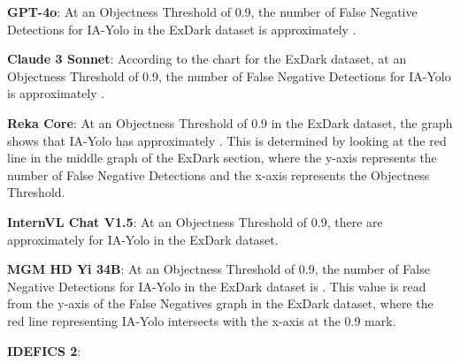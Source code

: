 \begin{wronganswer}
\textbf{GPT-4o}: \small{At an Objectness Threshold of 0.9, the number of False Negative Detections for IA-Yolo in the ExDark dataset is approximately .}
\end{wronganswer}

\begin{wronganswer}
\textbf{Claude 3 Sonnet}: \small{According to the chart for the ExDark dataset, at an Objectness Threshold of 0.9, the number of False Negative Detections for IA-Yolo is approximately .}
\end{wronganswer}

\begin{wronganswer}
\textbf{Reka Core}: \small{ At an Objectness Threshold of 0.9 in the ExDark dataset, the graph shows that IA-Yolo has approximately . This is determined by looking at the red line in the middle graph of the ExDark section, where the y-axis represents the number of False Negative Detections and the x-axis represents the Objectness Threshold. }
\end{wronganswer}

\begin{wronganswer}
\textbf{InternVL Chat V1.5}: \small{At an Objectness Threshold of 0.9, there are approximately  for IA-Yolo in the ExDark dataset.}
\end{wronganswer}

\begin{wronganswer}
\textbf{MGM HD Yi 34B}: \small{At an Objectness Threshold of 0.9, the number of False Negative Detections for IA-Yolo in the ExDark dataset is . This value is read from the y-axis of the False Negatives graph in the ExDark dataset, where the red line representing IA-Yolo intersects with the x-axis at the 0.9 mark.}
\end{wronganswer}

\begin{wronganswer}
\textbf{IDEFICS 2}: \small{}
\end{wronganswer}
\newpage


